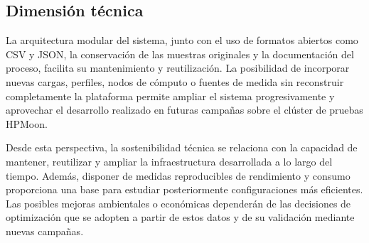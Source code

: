 \subsection{Dimensión técnica}

La arquitectura modular del sistema, junto con el uso de formatos abiertos como CSV y JSON, la conservación de las muestras originales y la documentación del proceso, facilita su mantenimiento y reutilización. La posibilidad de incorporar nuevas cargas, perfiles, nodos de cómputo o fuentes de medida sin reconstruir completamente la plataforma permite ampliar el sistema progresivamente y aprovechar el desarrollo realizado en futuras campañas sobre el clúster de pruebas HPMoon.

Desde esta perspectiva, la sostenibilidad técnica se relaciona con la capacidad de mantener, reutilizar y ampliar la infraestructura desarrollada a lo largo del tiempo. Además, disponer de medidas reproducibles de rendimiento y consumo proporciona una base para estudiar posteriormente configuraciones más eficientes. Las posibles mejoras ambientales o económicas dependerán de las decisiones de optimización que se adopten a partir de estos datos y de su validación mediante nuevas campañas.
